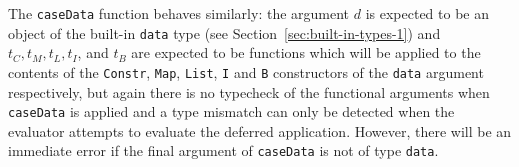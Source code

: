 The \texttt{caseData} function behaves similarly: the argument $d$ is expected
to be an object of the built-in \texttt{data} type (see
Section~\ref{sec:built-in-types-1}) and $t_C, t_M, t_L, t_I$, and $t_B$ are
expected to be functions which will be applied to the contents of
the \texttt{Constr}, \texttt{Map}, \texttt{List}, \texttt{I} and \texttt{B}
constructors of the \texttt{data} argument respectively, but again there is no
typecheck of the functional arguments when \texttt{caseData} is applied and a
type mismatch can only be detected when the evaluator attempts to evaluate the
deferred application.  However, there will be an immediate error if the final
argument of \texttt{caseData} is not of type \texttt{data}.



